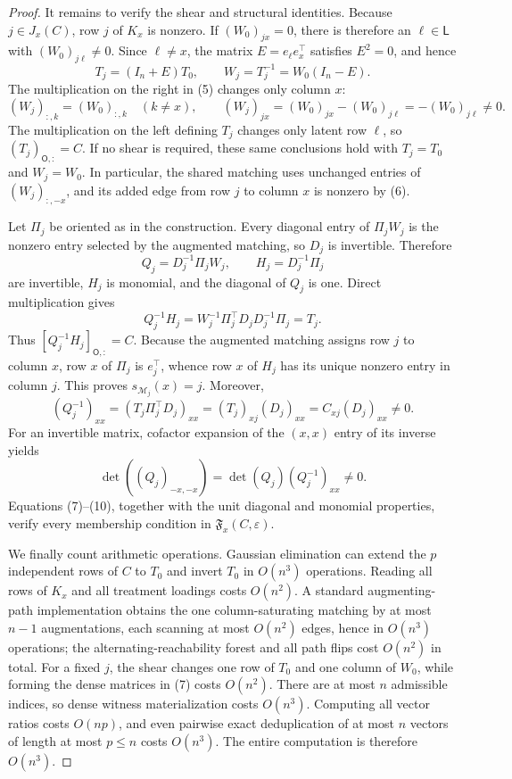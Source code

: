 \documentclass{article}
\begin{document}
\begin{proof}
It remains to verify the shear and structural identities. Because \(j\in J_x(C)\), row \(j\) of \(K_x\) is nonzero. If \((W_0)_{jx}=0\), there is therefore an \(\ell\in\mathsf L\) with \((W_0)_{j\ell}\ne0\). Since \(\ell\ne x\), the matrix \(E=e_\ell e_x^\top\) satisfies \(E^2=0\), and hence
\[
 T_j=(I_n+E)T_0,
 \qquad
 W_j=T_j^{-1}=W_0(I_n-E). \tag{5}
\]
The multiplication on the right in (5) changes only column \(x\):
\[
 (W_j)_{:,k}=(W_0)_{:,k}\quad(k\ne x),
 \qquad
 (W_j)_{jx}=(W_0)_{jx}-(W_0)_{j\ell}=-(W_0)_{j\ell}\ne0. \tag{6}
\]
The multiplication on the left defining \(T_j\) changes only latent row \(\ell\), so \((T_j)_{\mathsf O,:}=C\). If no shear is required, these same conclusions hold with \(T_j=T_0\) and \(W_j=W_0\). In particular, the shared matching uses unchanged entries of \((W_j)_{:,-x}\), and its added edge from row \(j\) to column \(x\) is nonzero by (6).

Let \(\Pi_j\) be oriented as in the construction. Every diagonal entry of \(\Pi_jW_j\) is the nonzero entry selected by the augmented matching, so \(D_j\) is invertible. Therefore
\[
 Q_j=D_j^{-1}\Pi_jW_j,
 \qquad
 H_j=D_j^{-1}\Pi_j   \tag{7}
\]
are invertible, \(H_j\) is monomial, and the diagonal of \(Q_j\) is one. Direct multiplication gives
\[
 Q_j^{-1}H_j
 =W_j^{-1}\Pi_j^\top D_jD_j^{-1}\Pi_j
 =T_j. \tag{8}
\]
Thus \([Q_j^{-1}H_j]_{\mathsf O,:}=C\). Because the augmented matching assigns row \(j\) to column \(x\), row \(x\) of \(\Pi_j\) is \(e_j^\top\), whence row \(x\) of \(H_j\) has its unique nonzero entry in column \(j\). This proves \(s_{\mathcal M_j}(x)=j\). Moreover,
\[
 (Q_j^{-1})_{xx}
 =(T_j\Pi_j^\top D_j)_{xx}
 =(T_j)_{xj}(D_j)_{xx}
 =C_{xj}(D_j)_{xx}\ne0. \tag{9}
\]
For an invertible matrix, cofactor expansion of the \((x,x)\) entry of its inverse yields
\[
 \det((Q_j)_{-x,-x})=\det(Q_j)(Q_j^{-1})_{xx}\ne0. \tag{10}
\]
Equations (7)--(10), together with the unit diagonal and monomial properties, verify every membership condition in \(\mathfrak F_x(C,\varepsilon)\).

We finally count arithmetic operations. Gaussian elimination can extend the \(p\) independent rows of \(C\) to \(T_0\) and invert \(T_0\) in \(O(n^3)\) operations. Reading all rows of \(K_x\) and all treatment loadings costs \(O(n^2)\). A standard augmenting-path implementation obtains the one column-saturating matching by at most \(n-1\) augmentations, each scanning at most \(O(n^2)\) edges, hence in \(O(n^3)\) operations; the alternating-reachability forest and all path flips cost \(O(n^2)\) in total. For a fixed \(j\), the shear changes one row of \(T_0\) and one column of \(W_0\), while forming the dense matrices in (7) costs \(O(n^2)\). There are at most \(n\) admissible indices, so dense witness materialization costs \(O(n^3)\). Computing all vector ratios costs \(O(np)\), and even pairwise exact deduplication of at most \(n\) vectors of length at most \(p\le n\) costs \(O(n^3)\). The entire computation is therefore \(O(n^3)\).


\end{proof}
\end{document}
